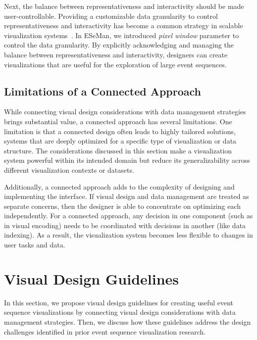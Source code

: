 \begin{refsection}
Next, the balance between representativeness and interactivity should be made user-controllable. Providing a customizable data granularity to control representativeness and interactivity has become a common strategy in scalable visualization systems~\cite{tao2019kyrix, chen2021pyramid, heer2023mosaic, ulmer2023survey, hografer2023tailorable}. In ESeMan, we introduced \emph{pixel window} parameter to control the data granularity. By explicitly acknowledging and managing the balance between representativeness and interactivity, designers can create visualizations that are useful for the exploration of large event sequences.

\subsection{Limitations of a Connected Approach}

While connecting visual design considerations with data management strategies brings substantial value, a connected approach has several limitations. One limitation is that a connected design often leads to highly tailored solutions, systems that are deeply optimized for a specific type of visualization or data structure. The considerations discussed in this section make a visualization system powerful within its intended domain but reduce its generalizability across different visualization contexts or datasets.

Additionally, a connected approach adds to the complexity of designing and implementing the interface. If visual design and data management are treated as separate concerns, then the designer is able to concentrate on optimizing each independently. For a connected approach, any decision in one component (such as in visual encoding) needs to be coordinated with decisions in another (like data indexing). As a result, the visualization system becomes less flexible to changes in user tasks and data.

\section{Visual Design Guidelines}

In this section, we propose visual design guidelines for creating useful event sequence visualizations by connecting visual design considerations with data management strategies. Then, we discuss how these guidelines address the design challenges identified in prior event sequence visualization research.



\end{refsection}
